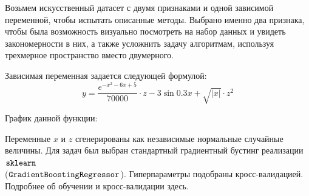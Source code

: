 Возьмем искусственный датасет с двумя признаками и одной зависимой переменной, чтобы испытать описанные методы. Выбрано именно два признака, чтобы была возможность визуально посмотреть на набор данных и увидеть закономерности в них, а также усложнить задачу алгоритмам, используя трехмерное пространство вместо двумерного.

Зависимая переменная задается следующей формулой:
\[
y = \frac{e^{-x^2-6x+5}}{70000} \cdot z - 3 \sin 0.3x + \sqrt{|x|} \cdot z^2
\]

График данной функции:

\vspace{-3mm}
\begin{figure}[h]
\end{figure}
\vspace{-3mm}

Переменные $x$ и $z$ сгенерированы как независимые нормальные случайные величины. Для задач был выбран стандартный градиентный бустинг реализации $\verb|sklearn|$\\ ($\verb|GradientBoostingRegressor|$). Гиперпараметры подобраны кросс-валидацией. Подробнее об обучении и кросс-валидации здесь.